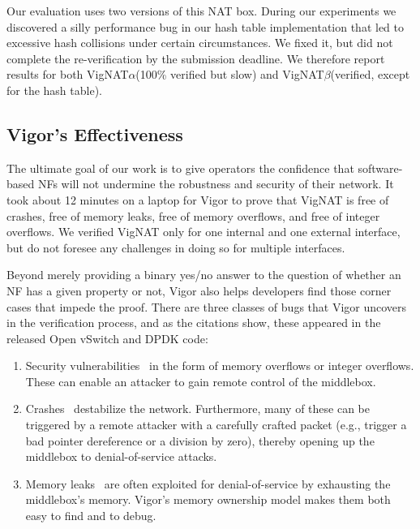\documentclass[letterpaper,twocolumn,10pt]{article}
\newcommand{\vignat}{{\sc VigNAT}\xspace}
\newcommand{\vignata}{{\sc VigNAT$\alpha$}\xspace}
\newcommand{\vignatb}{{\sc VigNAT$\beta$}\xspace}
\begin{document}
Our evaluation uses two versions of this NAT box. During our experiments we discovered a silly performance bug in our hash table implementation that led to excessive hash collisions under certain circumstances. We fixed it, but did not complete the re-verification by the submission deadline. We therefore report results for both \vignata (100\% verified but slow) and \vignatb (verified, except for the hash table).

\subsection{Vigor's Effectiveness}
\label{sec:effectiveness}

The ultimate goal of our work is to give operators the confidence that software-based NFs will not undermine the robustness and security of their network. It took about 12 minutes on a laptop for Vigor to prove that \vignat is free of crashes, free of memory leaks, free of memory overflows, and free of integer overflows. We verified \vignat only for one internal and one external interface, but do not foresee any challenges in doing so for multiple interfaces. 

Beyond merely providing a binary yes/no answer to the question of whether an NF has a given property or not, Vigor also helps developers find those corner cases that impede the proof. There are three classes of bugs that Vigor uncovers in the verification process, and as the citations show, these appeared in the released Open vSwitch and DPDK code:
\begin{enumerate}

    \item Security vulnerabilities~\cite{bug:ovs-uaf, bug:dpdk-uaf1, bug:dpdk-uaf2, bug:ovs-faf, bug:ovs-overflow, bug:dpdk-overflow1, bug:dpdk-overflow2, bug:ovs-int-overflow, bug:dpdk-int-overflow} in the form of memory overflows or integer overflows. These can enable an attacker to gain remote control of the middlebox.
    
    \item Crashes~\cite{bug:ovs-0ptr, bug:dpdk-0ptr1, bug:dpdk-0ptr2, bug:dpdk-0ptr3} destabilize the network. Furthermore, many of these can be triggered by a remote attacker with a carefully crafted packet (e.g., trigger a bad pointer dereference or a division by zero), thereby opening up the middlebox to denial-of-service attacks.

    \item Memory leaks~\cite{bug:ovs-mem-leak1, bug:ovs-mem-leak2, bug:ovs-mem-leak3, bug:ovs-mem-leak4, bug:dpdk-mem-leak1, bug:dpdk-mem-leak2} are often exploited for denial-of-service by exhausting the middlebox's memory. Vigor's memory ownership model makes them both easy to find and to debug.

\end{enumerate}
\end{document}
